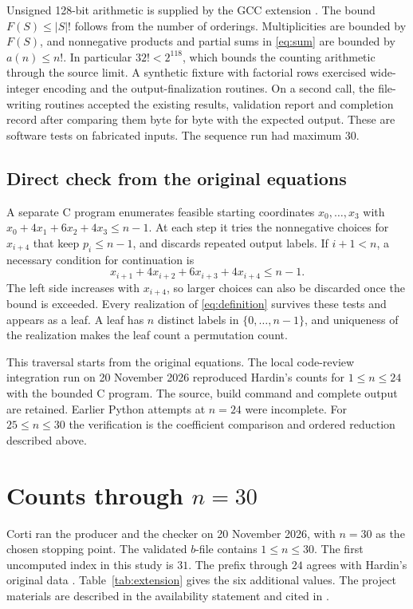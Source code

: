 \documentclass[11pt]{article}
\begin{document}
Unsigned 128-bit arithmetic is supplied by the GCC extension
\cite{gcc128}. The bound \(F(S)\le |S|!\) follows from the number of
orderings. Multiplicities are bounded by \(F(S)\), and nonnegative
products and partial sums in \eqref{eq:sum} are bounded by \(a(n)\le n!\).
In particular \(32!<2^{118}\), which bounds the counting arithmetic
through the source limit. A synthetic fixture with factorial rows exercised
wide-integer encoding and the output-finalization routines. On a second
call, the file-writing routines accepted the existing results, validation
report and completion record after comparing them byte for byte with the
expected output.
These are software tests on fabricated inputs. The sequence run had
maximum \(30\).

\subsection{Direct check from the original equations}

A separate C program enumerates feasible starting coordinates
\(x_0,\ldots,x_3\) with
\(x_0+4x_1+6x_2+4x_3\le n-1\). At each step it tries the nonnegative
choices for \(x_{i+4}\) that keep \(p_i\le n-1\), and discards repeated
output labels. If \(i+1<n\), a necessary condition for continuation is
\[
 x_{i+1}+4x_{i+2}+6x_{i+3}+4x_{i+4}\le n-1.
\]
The left side increases with \(x_{i+4}\), so larger choices can also be
discarded once the bound is exceeded. Every realization of
\eqref{eq:definition} survives these tests and appears as a leaf. A
leaf has \(n\) distinct labels in \(\{0,\ldots,n-1\}\), and uniqueness
of the realization makes the leaf count a permutation count.

This traversal starts from the original equations. The local
code-review integration run on 20 November 2026 reproduced Hardin's
counts for \(1\le n\le24\) with the bounded C program. The source,
build command and complete output are retained. Earlier Python
attempts at \(n=24\) were incomplete. For \(25\le n\le30\) the
verification is the coefficient comparison and ordered reduction
described above.

\section{Counts through \texorpdfstring{\(n=30\)}{n=30}}

Corti ran the producer and the checker on 20 November 2026, with
\(n=30\) as the chosen stopping point. The validated \(b\)-file
contains \(1\le n\le30\). The first uncomputed index in this study is
\(31\). The prefix through \(24\) agrees with Hardin's original
data \cite{hardin215}. Table~\ref{tab:extension} gives the six additional
values. The project materials are described in the availability statement
and cited in \cite{corti}.
\end{document}
